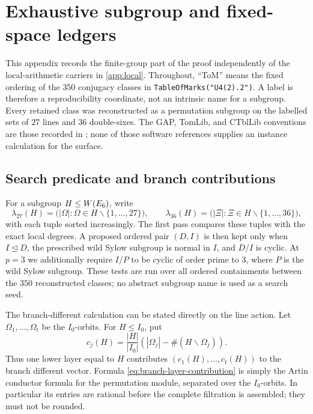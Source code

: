 \section{Exhaustive subgroup and fixed-space ledgers}
\label{app:groups}

This appendix records the finite-group part of the proof independently of
the local-arithmetic carriers in \cref{app:local}.  Throughout, ``ToM'' means
the fixed ordering of the $350$ conjugacy classes in
\texttt{TableOfMarks("U4(2).2")}.  A label is therefore a reproducibility
coordinate, not an intrinsic name for a subgroup.  Every retained class was
reconstructed as a permutation subgroup on the labelled sets of $27$ lines
and $36$ double-sixes.  The GAP, TomLib, and CTblLib conventions are those
recorded in \citep{gap2021,tomlib2019,ctbllib2020}; none of those software
references supplies an instance calculation for the surface.

\subsection{Search predicate and branch contributions}

For a subgroup $H\leq W(E_6)$, write
\[
 \lambda_{27}(H)=\bigl(|\Omega|:\Omega\in H\backslash\{1,\ldots,27\}\bigr),
 \qquad
 \lambda_{36}(H)=\bigl(|\Xi|:\Xi\in H\backslash\{1,\ldots,36\}\bigr),
\]
with each tuple sorted increasingly.  The first pass compares these tuples
with the exact local degrees.  A proposed ordered pair $(D,I)$ is then kept
only when $I\trianglelefteq D$, the prescribed wild Sylow subgroup is normal
in $I$, and $D/I$ is cyclic.  At $p=3$ we additionally require $I/P$ to be
cyclic of order prime to $3$, where $P$ is the wild Sylow subgroup.  These
tests are run over all ordered containments between the $350$ reconstructed
classes; no abstract subgroup name is used as a search seed.

The branch-different calculation can be stated directly on the line action.
Let $\Omega_1,\ldots,\Omega_t$ be the $I_0$-orbits.  For $H\leq I_0$, put
\begin{equation}
 c_j(H)=\frac{|H|}{|I_0|}
 \left(|\Omega_j|-\#(H\backslash\Omega_j)\right).
 \label{eq:branch-layer-contribution}
\end{equation}
Thus one lower layer equal to $H$ contributes
$(c_1(H),\ldots,c_t(H))$ to the branch different vector.  Formula
\cref{eq:branch-layer-contribution} is simply the Artin conductor formula for
the permutation module, separated over the $I_0$-orbits.  In particular its
entries are rational before the complete filtration is assembled; they must
not be rounded.

